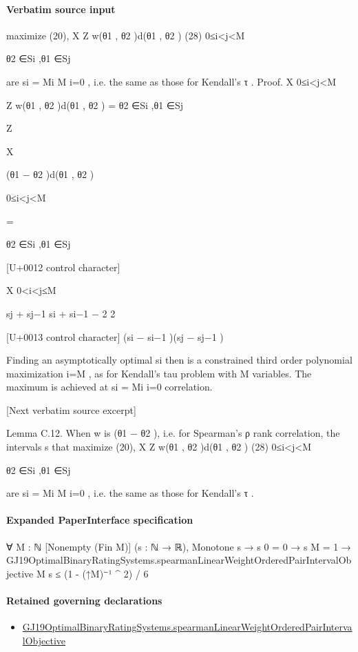 \documentclass[10pt]{article}
\begin{document}
\paragraph{Verbatim source input}
\begin{ReviewVerbatim}
maximize (20),
X Z
w(θ1 , θ2 )d(θ1 , θ2 )
(28)
0≤i<j<M

θ2 ∈Si ,θ1 ∈Sj

are {si = Mi }M
i=0 , i.e. the same as those for Kendall’s τ .
Proof.
X
0≤i<j<M

Z
w(θ1 , θ2 )d(θ1 , θ2 ) =
θ2 ∈Si ,θ1 ∈Sj

Z

X

(θ1 − θ2 )d(θ1 , θ2 )

0≤i<j<M

=

θ2 ∈Si ,θ1 ∈Sj

[U+0012 control character]

X
0<i<j≤M

sj + sj−1 si + si−1
−
2
2

[U+0013 control character]
(si − si−1 )(sj − sj−1 )

Finding an asymptotically optimal {si } then is a constrained third order polynomial maximization
i=M , as for Kendall’s tau
problem with M variables. The maximum is achieved at {si = Mi }i=0
correlation.


[Next verbatim source excerpt]

Lemma C.12. When w is (θ1 − θ2 ), i.e. for Spearman’s ρ rank correlation, the intervals s that
maximize (20),
X Z
w(θ1 , θ2 )d(θ1 , θ2 )
(28)
0≤i<j<M

θ2 ∈Si ,θ1 ∈Sj

are {si = Mi }M
i=0 , i.e. the same as those for Kendall’s τ .
\end{ReviewVerbatim}



\paragraph{Expanded PaperInterface specification}
\begin{ReviewVerbatim}
∀ {M : ℕ} [Nonempty (Fin M)] (s : ℕ → ℝ),
  Monotone s →
    s 0 = 0 →
      s M = 1 →
        GJ19OptimalBinaryRatingSystems.spearmanLinearWeightOrderedPairIntervalObjective M s ≤ (1 - (↑M)⁻¹ ^ 2) / 6
\end{ReviewVerbatim}

\paragraph{Retained governing declarations}
\begin{itemize}\raggedright
\item \hyperlink{paper-prerequisite-1a9e2c8c37b126ef}{GJ19\allowbreak{}Optimal\allowbreak{}Binary\allowbreak{}Rating\allowbreak{}Systems.\allowbreak{}spearman\allowbreak{}Linear\allowbreak{}Weight\allowbreak{}Ordered\allowbreak{}Pair\allowbreak{}Interval\allowbreak{}Objective}
\end{itemize}
\end{document}
